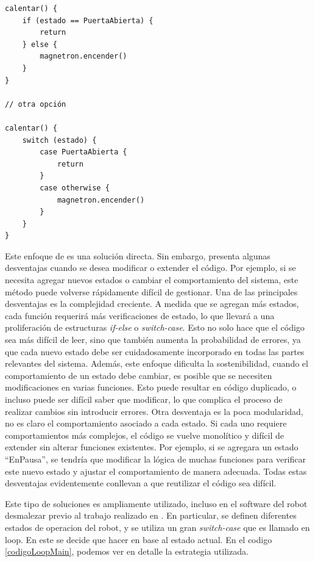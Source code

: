 \begin{lstlisting}
calentar() {
    if (estado == PuertaAbierta) {
        return
    } else {
        magnetron.encender()
    }
}

// otra opción

calentar() {
    switch (estado) {
    	case PuertaAbierta {
        	return
        }
    	case otherwise {
    	    magnetron.encender()
	    }
	}
}

\end{lstlisting}

Este enfoque de es una solución directa. Sin embargo, presenta algunas desventajas cuando se desea modificar o extender el código. Por ejemplo, si se necesita agregar nuevos estados o cambiar el comportamiento del sistema, este método puede volverse rápidamente difícil de gestionar. Una de las principales desventajas es la complejidad creciente. A medida que se agregan más estados, cada función requerirá más verificaciones de estado, lo que llevará a una proliferación de estructuras \textit{if-else} o \textit{switch-case}. Esto no solo hace que el código sea más difícil de leer, sino que también aumenta la probabilidad de errores, ya que cada nuevo estado debe ser cuidadosamente incorporado en todas las partes relevantes del sistema. Además, este enfoque dificulta la sostenibilidad, cuando el comportamiento de un estado debe cambiar, es posible que se necesiten modificaciones en varias funciones. Esto puede resultar en código duplicado, o incluso puede ser difícil saber que modificar, lo que complica el proceso de realizar cambios sin introducir errores. Otra desventaja es la poca modularidad, no es claro el comportamiento asociado a cada estado. Si cada uno requiere comportamientos más complejos, el código se vuelve monolítico y difícil de extender sin alterar funciones existentes. Por ejemplo, si se agregara un estado ``EnPausa'', se tendría que modificar la lógica de muchas funciones para verificar este nuevo estado y ajustar el comportamiento de manera adecuada. Todas estas desventajas evidentemente conllevan a que reutilizar el código sea difícil.

Este tipo de soluciones es ampliamente utilizado, incluso en el software del robot desmalezar previo al trabajo realizado en \cite{paperPomponio}. En particular, se definen diferentes estados de operacion del robot, y se utiliza un gran \textit{switch-case} que es llamado en loop. En este se decide que hacer en base al estado actual. En el codigo \ref{codigoLoopMain}, podemos ver en detalle la estrategia utilizada.


